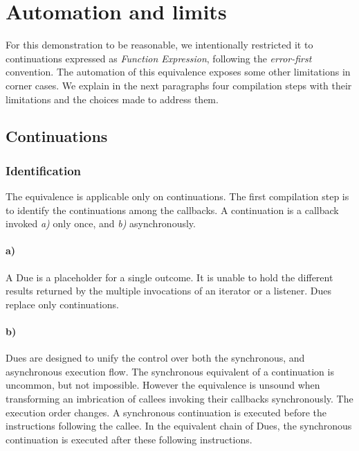 \section{Automation and limits} \label{section:limits}


For this demonstration to be reasonable, we intentionally restricted it to continuations expressed as \textit{Function Expression}, following the \textit{error-first} convention.
The automation of this equivalence exposes some other limitations in corner cases.
We explain in the next paragraphs four compilation steps with their limitations and the choices made to address them.

\subsection{Continuations}

\subsubsection{Identification}

The equivalence is applicable only on continuations.
The first compilation step is to identify the continuations among the callbacks.
A continuation is a callback invoked \textit{a)} only once, and \textit{b)} asynchronously.

\paragraph{a)}
A Due is a placeholder for a single outcome.
It is unable to hold the different results returned by the multiple invocations of an iterator or a listener.
Dues replace only continuations.

\paragraph{b)}
Dues are designed to unify the control over both the synchronous, and asynchronous execution flow.
The synchronous equivalent of a continuation is uncommon, but not impossible.
However the equivalence is unsound when transforming an imbrication of callees invoking their callbacks synchronously.
The execution order changes.
A synchronous continuation is executed before the instructions following the callee.
In the equivalent chain of Dues, the synchronous continuation is executed after these following instructions.

